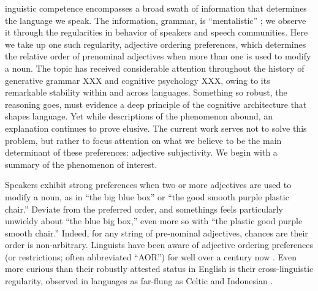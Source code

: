 \documentclass{pnastwo}
\begin{document}
\begin{article}
\begin{abstract}
{Abstract here\ldots}
\end{abstract}



inguistic competence encompasses a broad swath of information that determines the language we speak. The information, grammar, is ``mentalistic'' \cite{chomsky1965}; we observe it through the regularities in behavior of speakers and speech communities. Here we take up one such regularity, adjective ordering preferences, which determines the relative order of prenominal adjectives when more than one is used to modify a noun. The topic has received considerable attention throughout the history of generative grammar XXX and cognitive psychology XXX, owing to its remarkable stability within and across languages. Something so robust, the reasoning goes, must evidence a deep principle of the cognitive architecture that shapes language. Yet while descriptions of the phenomenon abound, an explanation continues to prove elusive. The current work serves not to solve this problem, but rather to focus attention on what we believe to be the main determinant of these preferences: adjective subjectivity. We begin with a summary of the phenomenon of interest.

Speakers exhibit strong preferences when two or more adjectives are used to modify a noun, as in ``the big blue box'' or ``the good smooth purple plastic chair.'' Deviate from the preferred order, and somethings feels particularly unwieldy about ``the blue big box,'' even more so with ``the plastic good purple smooth chair.'' Indeed, for any string of pre-nominal adjectives, chances are their order is non-arbitrary. Linguists have been aware of adjective ordering preferences (or restrictions; often abbreviated ``AOR'') for well over a century now \cite{sweet1898,bloomfield1933}. Even more curious than their robustly attested status in English is their cross-linguistic regularity, observed in languages as far-flung as Celtic \cite{sproatshih1991} and Indonesian \cite{martin1969competence}.


\end{article}
\end{document}
